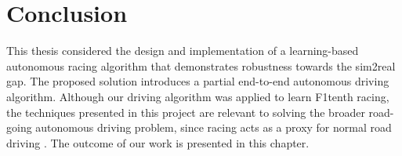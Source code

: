 \chapter{Conclusion}\label{chp:conclusion}

This thesis considered the design and implementation of a learning-based autonomous racing algorithm that demonstrates robustness towards the sim2real gap.
The proposed solution introduces a partial end-to-end autonomous driving algorithm. 
Although our driving algorithm was applied to learn F1tenth racing, the techniques presented in this project are relevant to solving the broader road-going autonomous driving problem, since racing acts as a proxy for normal road driving \cite{Weiss2020a}.
The outcome of our work is presented in this chapter.








